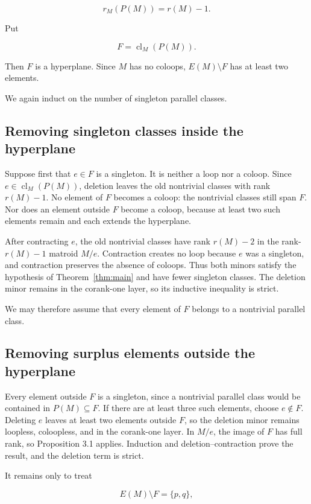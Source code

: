 \documentclass[11pt]{article}
\begin{document}
\[
r_M(P(M))=r(M)-1.
\]

Put

\[
F=\operatorname{cl}_M(P(M)).
\]

Then \(F\) is a hyperplane. Since \(M\) has no coloops,
\(E(M)\setminus F\) has at least two elements.

We again induct on the number of singleton parallel classes.

\subsection{Removing singleton classes inside the hyperplane}


Suppose first that \(e\in F\) is a singleton. It is neither a loop nor a
coloop. Since \(e\in\operatorname{cl}_M(P(M))\), deletion leaves the old
nontrivial classes with rank \(r(M)-1\). No element of \(F\) becomes a coloop:
the nontrivial classes still span \(F\). Nor does an element outside \(F\)
become a coloop, because at least two such elements remain and each extends
the hyperplane.

After contracting \(e\), the old nontrivial classes have rank \(r(M)-2\) in
the rank-\(r(M)-1\) matroid \(M/e\). Contraction creates no loop because
\(e\) was a singleton, and contraction preserves the absence of coloops.
Thus both minors satisfy the hypothesis of Theorem~\ref{thm:main} and have fewer
singleton classes. The deletion minor remains in the corank-one layer, so its
inductive inequality is strict.

We may therefore assume that every element of \(F\) belongs to a nontrivial
parallel class.

\subsection{Removing surplus elements outside the hyperplane}


Every element outside \(F\) is a singleton, since a nontrivial parallel class
would be contained in \(P(M)\subseteq F\). If there are at least three such
elements, choose \(e\notin F\). Deleting \(e\) leaves at least two elements
outside \(F\), so the deletion minor remains loopless, coloopless, and in the
corank-one layer. In \(M/e\), the image of \(F\) has full rank, so Proposition
3.1 applies. Induction and deletion--contraction prove the result, and the
deletion term is strict.

It remains only to treat

\[
E(M)\setminus F=\{p,q\},                       \tag{4.1}
\]
\end{document}
